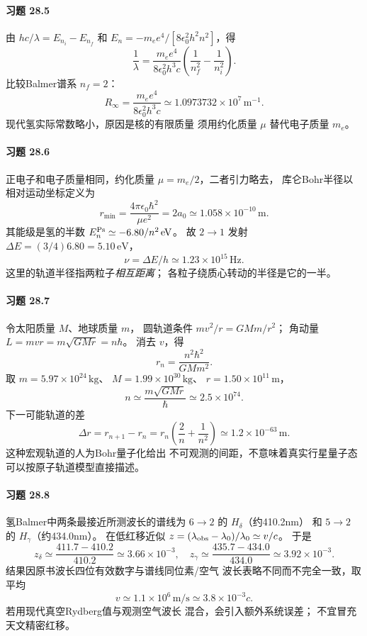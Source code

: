 \paragraph{习题 28.5}
由 \(hc/\lambda=E_{n_i}-E_{n_f}\)
和 \(E_n=-m_ee^4/[8\epsilon_0^2h^2n^2]\)，得
\[
\frac1\lambda
=\frac{m_ee^4}{8\epsilon_0^2h^3c}
\left(\frac1{n_f^2}-\frac1{n_i^2}\right).
\]
比较Balmer谱系 \(n_f=2\)：
\[
\boxed{R_\infty=\frac{m_ee^4}{8\epsilon_0^2h^3c}
\simeq1.0973732\times10^7\,\mathrm{m^{-1}}}.
\]
现代氢实际常数略小，原因是核的有限质量
须用约化质量 \(\mu\) 替代电子质量 \(m_e\)。

\paragraph{习题 28.6}
正电子和电子质量相同，约化质量
\(\mu=m_e/2\)，二者引力略去，
库仑Bohr半径以相对运动坐标定义为
\[
\boxed{r_{\min}=\frac{4\pi\epsilon_0\hbar^2}{\mu e^2}
=2a_0\simeq1.058\times10^{-10}\,\mathrm m}.
\]
其能级是氢的半数
\(E_n^{\rm Ps}\simeq-6.80/n^2\,\mathrm{eV}\)。
故 \(2\to1\) 发射
\(\Delta E=(3/4)6.80=5.10\,\mathrm{eV}\)，
\[
\boxed{\nu=\Delta E/h\simeq1.23\times10^{15}\,\mathrm{Hz}}.
\]
这里的轨道半径指两粒子\emph{相互距离}；
各粒子绕质心转动的半径是它的一半。

\paragraph{习题 28.7}
令太阳质量 \(M\)、地球质量 \(m\)，
圆轨道条件 \(mv^2/r=GMm/r^2\)；
角动量 \(L=mvr=m\sqrt{GMr}=n\hbar\)。
消去 \(v\)，得
\[
\boxed{r_n=\frac{n^2\hbar^2}{GMm^2}}.
\]
取 \(m=5.97\times10^{24}\,\mathrm{kg}\)、
\(M=1.99\times10^{30}\,\mathrm{kg}\)、
\(r=1.50\times10^{11}\,\mathrm m\)，
\[
\boxed{n\simeq\frac{m\sqrt{GMr}}{\hbar}
\simeq2.5\times10^{74}}.
\]
下一可能轨道的差
\[
\boxed{\Delta r=r_{n+1}-r_n
=r_n\left(\frac{2}{n}+\frac1{n^2}\right)
\simeq1.2\times10^{-63}\,\mathrm m}.
\]
这种宏观轨道的人为Bohr量子化给出
不可观测的间距，不意味着真实行星量子态
可以按原子轨道模型直接描述。

\paragraph{习题 28.8}
氢Balmer中两条最接近所测波长的谱线为
\(6\to2\) 的 \(H_\delta\)（约410.2nm）
和 \(5\to2\) 的 \(H_\gamma\)（约434.0nm）。
在低红移近似
\(z=(\lambda_{\rm obs}-\lambda_0)/\lambda_0
\simeq v/c\)。
于是
\[
\boxed{z_\delta\simeq\frac{411.7-410.2}{410.2}
\simeq3.66\times10^{-3}},\quad
\boxed{z_\gamma\simeq\frac{435.7-434.0}{434.0}
\simeq3.92\times10^{-3}}.
\]
结果因原书波长四位有效数字与谱线同位素/空气
波长表略不同而不完全一致，取平均
\[
\boxed{v\simeq1.1\times10^6\,\mathrm{m/s}
\simeq3.8\times10^{-3}c}.
\]
若用现代真空Rydberg值与观测空气波长
混合，会引入额外系统误差；
不宜冒充天文精密红移。

